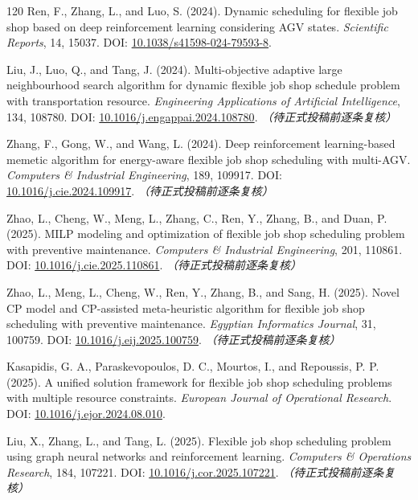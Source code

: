 \documentclass[UTF8,a4paper,11pt]{ctexart}
\begin{document}
\begin{thebibliography}{120}
Ren, F., Zhang, L., and Luo, S. (2024). Dynamic scheduling for flexible job shop based on deep reinforcement learning considering AGV states. \emph{Scientific Reports}, 14, 15037.
\newblock DOI: \href{https://doi.org/10.1038/s41598-024-79593-8}{10.1038/s41598-024-79593-8}.

Liu, J., Luo, Q., and Tang, J. (2024). Multi-objective adaptive large neighbourhood search algorithm for dynamic flexible job shop schedule problem with transportation resource. \emph{Engineering Applications of Artificial Intelligence}, 134, 108780.
\newblock DOI: \href{https://doi.org/10.1016/j.engappai.2024.108780}{10.1016/j.engappai.2024.108780}. \textit{（待正式投稿前逐条复核）}

Zhang, F., Gong, W., and Wang, L. (2024). Deep reinforcement learning-based memetic algorithm for energy-aware flexible job shop scheduling with multi-AGV. \emph{Computers \& Industrial Engineering}, 189, 109917.
\newblock DOI: \href{https://doi.org/10.1016/j.cie.2024.109917}{10.1016/j.cie.2024.109917}. \textit{（待正式投稿前逐条复核）}

Zhao, L., Cheng, W., Meng, L., Zhang, C., Ren, Y., Zhang, B., and Duan, P. (2025). MILP modeling and optimization of flexible job shop scheduling problem with preventive maintenance. \emph{Computers \& Industrial Engineering}, 201, 110861.
\newblock DOI: \href{https://doi.org/10.1016/j.cie.2025.110861}{10.1016/j.cie.2025.110861}. \textit{（待正式投稿前逐条复核）}

Zhao, L., Meng, L., Cheng, W., Ren, Y., Zhang, B., and Sang, H. (2025). Novel CP model and CP-assisted meta-heuristic algorithm for flexible job shop scheduling with preventive maintenance. \emph{Egyptian Informatics Journal}, 31, 100759.
\newblock DOI: \href{https://doi.org/10.1016/j.eij.2025.100759}{10.1016/j.eij.2025.100759}. \textit{（待正式投稿前逐条复核）}

Kasapidis, G. A., Paraskevopoulos, D. C., Mourtos, I., and Repoussis, P. P. (2025). A unified solution framework for flexible job shop scheduling problems with multiple resource constraints. \emph{European Journal of Operational Research}.
\newblock DOI: \href{https://doi.org/10.1016/j.ejor.2024.08.010}{10.1016/j.ejor.2024.08.010}.

Liu, X., Zhang, L., and Tang, L. (2025). Flexible job shop scheduling problem using graph neural networks and reinforcement learning. \emph{Computers \& Operations Research}, 184, 107221.
\newblock DOI: \href{https://doi.org/10.1016/j.cor.2025.107221}{10.1016/j.cor.2025.107221}. \textit{（待正式投稿前逐条复核）}


\end{thebibliography}
\end{document}
